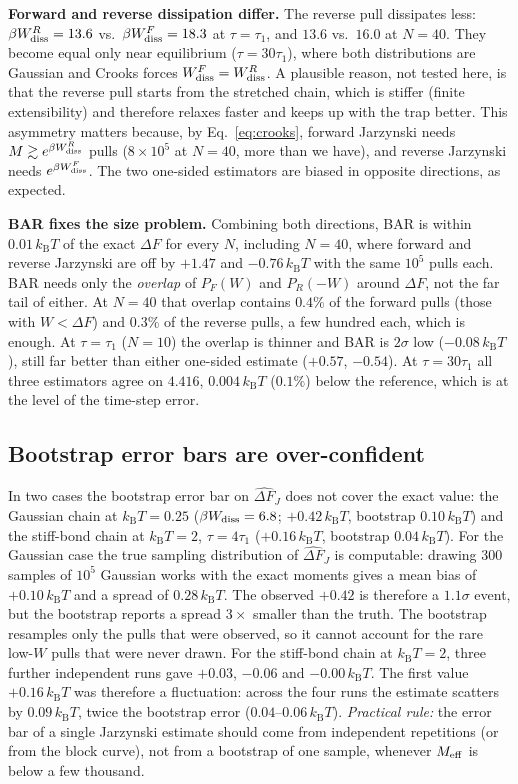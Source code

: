\documentclass[11pt,a4paper]{article}
\newcommand{\kT}{k_{\mathrm B}T}
\newcommand{\Wd}{W_{\rm diss}}
\newcommand{\dFJ}{\widehat{\Delta F}_J}
\begin{document}
\noindent\textbf{Forward and reverse dissipation differ.} The reverse pull dissipates less:
$\beta\Wd^R=13.6$ vs.\ $\beta\Wd^F=18.3$ at $\tau=\tau_1$, and $13.6$ vs.\ $16.0$ at $N=40$. They become
equal only near equilibrium ($\tau=30\tau_1$), where both distributions are Gaussian and Crooks forces
$\Wd^F=\Wd^R$. A plausible reason, not tested here, is that the reverse pull starts from the stretched
chain, which is stiffer (finite extensibility) and therefore relaxes faster and keeps up with the
trap better. This asymmetry matters because, by Eq.~\eqref{eq:crooks}, forward Jarzynski needs
$M\gtrsim e^{\beta\Wd^R}$ pulls ($8\times10^5$ at $N=40$, more than we have), and reverse Jarzynski needs
$e^{\beta\Wd^F}$. The two one-sided estimators are biased in opposite directions, as expected.

\noindent\textbf{BAR fixes the size problem.} Combining both directions, BAR is within $0.01\,\kT$ of the
exact $\Delta F$ for every $N$, including $N=40$, where forward and reverse Jarzynski are off by
$+1.47$ and $-0.76\,\kT$ with the same $10^5$ pulls each. BAR needs only the \emph{overlap} of
$P_F(W)$ and $P_R(-W)$ around $\Delta F$, not the far tail of either. At $N=40$ that overlap
contains $0.4\%$ of the forward pulls (those with $W<\Delta F$) and $0.3\%$ of the reverse pulls, a few
hundred each, which is enough. At $\tau=\tau_1$ ($N=10$) the overlap is thinner and BAR is
$2\sigma$ low ($-0.08\,\kT$), still far better than either one-sided estimate ($+0.57$, $-0.54$). At
$\tau=30\tau_1$ all three estimators agree on $4.416$, $0.004\,\kT$ ($0.1\%$) below the reference, which is at
the level of the time-step error.

\subsection{Bootstrap error bars are over-confident}
\label{sec:bootstrap}
In two cases the bootstrap error bar on $\dFJ$ does not cover the exact value: the
Gaussian chain at $\kT=0.25$ ($\beta\Wd=6.8$; $+0.42\,\kT$, bootstrap $0.10\,\kT$) and the
stiff-bond chain at $\kT=2$, $\tau=4\tau_1$ ($+0.16\,\kT$, bootstrap $0.04\,\kT$). For the Gaussian
case the true sampling distribution of $\dFJ$ is computable: drawing $300$ samples of
$10^5$ Gaussian works with the exact moments gives a mean bias of $+0.10\,\kT$ and a spread of $0.28\,\kT$. The observed
$+0.42$ is therefore a $1.1\sigma$ event, but the bootstrap reports a spread $3\times$ smaller
than the truth. The bootstrap resamples only the pulls that were observed, so it cannot account
for the rare low-$W$ pulls that were never drawn. For the stiff-bond chain at $\kT=2$, three
further independent runs gave $+0.03$, $-0.06$ and $-0.00\,\kT$. The first value $+0.16\,\kT$ was
therefore a fluctuation: across the four runs the estimate scatters by $0.09\,\kT$, twice the
bootstrap error ($0.04$--$0.06\,\kT$). \emph{Practical rule:} the error bar of a single
Jarzynski estimate should come from independent repetitions (or from the block curve), not from
a bootstrap of one sample, whenever $M_{\rm eff}$ is below a few thousand.
\end{document}
